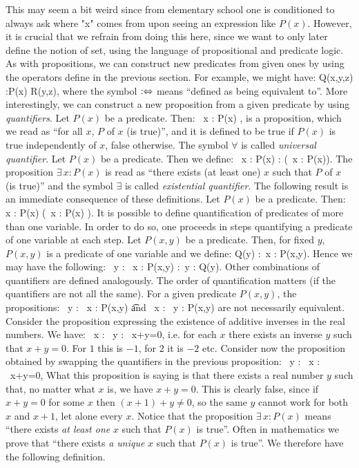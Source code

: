 This may seem a bit weird since from elementary school one is conditioned to always ask where "x" comes from upon seeing an expression like $P(x)$.
However, it is crucial that we refrain from doing this here, since we want to only later define the notion of set, using the language of propositional and predicate logic.
As with propositions, we can construct new predicates from given ones by using the operators define in the previous section. For example, we might have:
\bse
Q(x,y,z) :\eqv P(x) \land R(y,z),
\ese
where the symbol $:\Leftrightarrow$ means ``defined as being equivalent to''.
More interestingly, we can construct a new proposition from a given predicate by using \emph{quantifiers}.
\bd
Let $P(x)$ be a predicate. Then:
\bse
\forall \, x : P(x) ,
\ese
is a proposition, which we read as ``for all $x$, $P$ of $x$ (is true)'', and it is defined to be true if $P(x)$ is true independently of $x$, false otherwise. The symbol $\forall$ is called \emph{universal quantifier}.
\ed
\bd
Let $P(x)$ be a predicate.
Then we define:
\bse
\exists \, x : P(x) : \eqv \neg (\forall \, x : \neg P(x)).
\ese
The proposition $\exists \, x : P(x)$ is read as ``there exists (at least one) $x$ such that $P$ of $x$ (is true)'' and the symbol $\exists$ is called \emph{existential quantifier}.
\ed
The following result is an immediate consequence of these definitions.
\bc
Let $P(x)$ be a predicate. Then:
\bse
\forall \, x : P(x) \eqv \neg (\exists \, x : \neg P(x) ).
\ese
\ec
\br
It is possible to define quantification of predicates of more than one variable.
In order to do so, one proceeds in steps quantifying a predicate of one variable at each step. 
\er
\be
Let $P(x,y)$ be a predicate.
Then, for fixed $y$, $P(x,y)$ is a predicate of one variable and we define:
\bse
Q(y) :\eqv \forall \, x : P(x,y).
\ese
Hence we may have the following:
\bse
\exists \, y : \forall \, x : P(x,y) :\eqv \exists \, y : Q(y).
\ese
Other combinations of quantifiers are defined analogously.
\ee
\br
The order of quantification matters (if the quantifiers are not all the same).
For a given predicate $P(x,y)$, the propositions:
\bse
\exists \, y : \forall \, x : P(x,y)  \quad \t{and} \quad \forall \, x : \exists \, y : P(x,y) 
\ese
are not necessarily equivalent.
\er
\be
Consider the proposition expressing the existence of additive inverses in the real numbers. We have:
\bse
\forall \, x : \exists \, y : \ x+y=0,
\ese
i.e. for each $x$ there exists an inverse $y$ such that $x+y=0$. For $1$ this is $-1$, for $2$ it is $-2$ etc.
Consider now the proposition obtained by swapping the quantifiers in the previous proposition:
\bse
\exists \, y : \forall \, x : \ x+y=0,
\ese
What this proposition is saying is that there exists a real number $y$ such that, no matter what $x$ is, we have $x+y=0$.
This is clearly false, since if $x+y=0$ for some $x$ then $(x+1)+y\neq 0$, so the same $y$ cannot work for both $x$ and $x+1$, let alone every $x$.
\ee
Notice that the proposition $\exists \, x : P(x)$ means ``there exists \emph{at least one} $x$ such that $P(x)$ is true''. Often in mathematics we prove that ``there exists \emph{a unique} $x$ such that $P(x)$ is true''. We therefore have the following definition.

